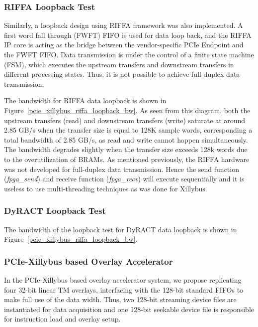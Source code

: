 

\subsubsection{RIFFA Loopback Test}
Similarly, a loopback design using RIFFA framework was also implemented. 
A first word fall through (FWFT) FIFO is used for data loop back, and the RIFFA IP core is acting as the bridge between the vendor-specific PCIe Endpoint and the FWFT FIFO. 
Data transmission is under the control of a finite state machine (FSM), which executes the upstream transfers and downstream transfers in different processing states.  
Thus, it is not possible to achieve full-duplex data transmission. 

The bandwidth for RIFFA data loopback is shown in Figure~\ref{pcie_xillybus_riffa_loopback_bw}. 
As seen from this diagram, both the upstream transfers (read) and downstream transfers (write) saturate at around 2.85 GB/s when the transfer size is equal to 128K sample words, corresponding a total bandwidth of 2.85 GB/s, as read and write cannot happen simultaneously. 
The bandwidth degrades slightly when the transfer size exceeds 128k words due to the overutilization of BRAMs.
As mentioned previously, the RIFFA hardware was not developed for full-duplex data transmission. 
Hence the send function (\textit{fpga\_send}) and receive function (\textit{fpga\_recv}) will execute sequentially and it is useless to use multi-threading techniques as was done for Xillybus. 

\subsubsection{DyRACT Loopback Test}
The bandwidth of the loopback test for DyRACT data loopback is shown in Figure~\ref{pcie_xillybus_riffa_loopback_bw}. 



\subsubsection{PCIe-Xillybus based Overlay Accelerator}
In the PCIe-Xillybus based overlay accelerator system, we propose replicating four 32-bit linear TM overlays, interfacing with the 128-bit standard FIFOs to make full use of the data width.
Thus, two 128-bit streaming device files are instantiated for data acquisition and one 128-bit seekable device file is responsible for instruction load and overlay setup. 

